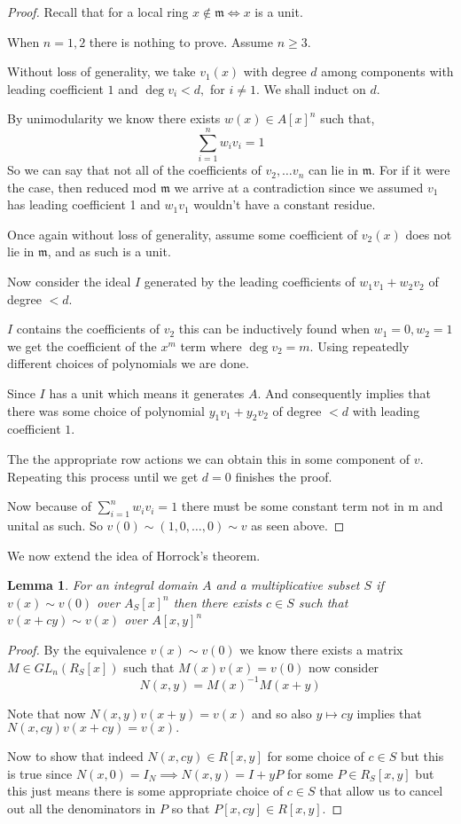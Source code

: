 \documentclass[12pt]{article}
\numberwithin{equation}{section}
\newcounter{dummy} \numberwithin{dummy}{section}
\newtheorem{lemma}[dummy]{Lemma}
\begin{document}
	\begin{proof}
	Recall that for a local ring $x \not \in \mathfrak m \iff x  $ is a unit.
	
	When $n=1,2 $ there is nothing to prove. Assume $n \geq 3$.
	
	
	Without loss of generality, we take $v_1(x)$ with degree $d $ among components with leading coefficient $1$ and $\deg v_i < d, $ for $i \neq 1$. We shall induct on $d$.
	
	By unimodularity we know there exists $w(x)\in A[x]^n$ such that,
	\[ \sum_{i=1}^n w_i v_i = 1 \]
	So we can say that not all of the coefficients of $v_2, \dots v_n $ can lie in $\mathfrak m$. For if it were the case, then reduced mod $\mathfrak m$ we arrive at a contradiction since we assumed $v_1 $ has leading coefficient 1 and $w_1v_1$ wouldn't have a constant residue.
	
	Once again without loss of generality, assume some coefficient of $v_2(x)$ does not lie in $\mathfrak m$, and as such is a unit.
	
	Now consider the ideal $I$ generated by the leading coefficients of $w_1v_1+w_2v_2$ of degree $< d.$ 
	
	$I$ contains the coefficients of $v_2$ this can be inductively found when $w_1=0, w_2=1$ we get the coefficient of the $x^m$ term where $\deg v_2 = m$.
	Using repeatedly different choices of polynomials we are done.
	
	Since $I$ has a unit which means it generates $A$. And consequently implies that there was some choice of polynomial $y_1v_1+y_2v_2$ of degree $<d$ with leading coefficient $1$.
	
	The the appropriate row actions we can obtain this in some component of $v$. Repeating this process until we get $d=0$ finishes the proof.
	
	Now because of $\sum_{i=1}^n w_i v_i =1 $ there must be some constant term not in $\mathrm m $ and unital as such. So $v(0) \sim (1,0,\dots ,0 ) \sim v$ as seen above.
	\end{proof}
	
	We now extend the idea of Horrock's theorem.
	
	\begin{lemma}\label{horrocksbutforlocal}
		For an integral domain $A$ and a multiplicative subset $S$ if $v(x) \sim v(0)$ over $A_S[x]^n $ then there exists $c \in S$ such that $v(x+cy) \sim v(x) $ over $A[x,y]^n$
	\end{lemma}
	\begin{proof}
		By the equivalence $v(x) \sim v(0)$ we know there exists a matrix $M \in GL_n(R_S[x])$ such that $M(x)v(x)=v(0) $ now consider \[ N(x,y) = M(x)^{-1} M(x+y) \]
		
		Note that now $N(x,y)v(x+y)=v(x)$ and so also $y \mapsto cy$ implies that $N(x,cy)v(x+cy)=v(x).$
		
		Now to show that indeed $N(x,cy)\in R[x,y]$ for some choice of $c \in S$ but this is true since $N(x,0)=I_N \implies N(x,y)=I+yP $ for some $P \in R_S[x,y]$ but this just means there is some appropriate choice of $c \in S$ that allow us to cancel out all the denominators in $P$ so that $P[x,cy] \in R[x,y]$.
	\end{proof}
	
\end{document}

